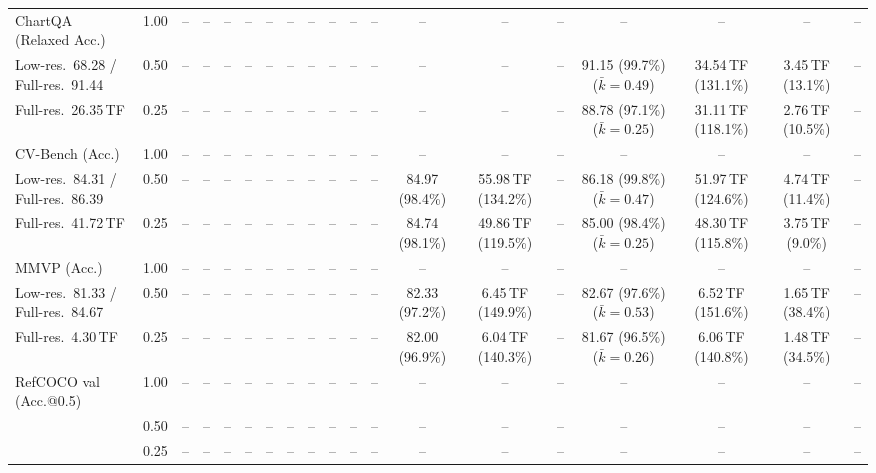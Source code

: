 \begin{table}[t]
{\begin{tabular}{l c | c c c c | c c c c | c c | c c c | c c c c}
\cmidrule(lr){1-19}
ChartQA (Relaxed Acc.) & 1.00 & -- & -- & -- & -- & -- & -- & -- & -- & -- & -- & -- & -- & -- & -- & -- & -- & -- \\
{\footnotesize Low-res.\ 68.28 / Full-res.\ 91.44} & 0.50 & -- & -- & -- & -- & -- & -- & -- & -- & -- & -- & -- & -- & -- & \cellcolor{gray!15}91.15 (99.7\%) {\footnotesize ($\bar k{=}0.49$)} & 34.54\,TF (131.1\%) & 3.45\,TF (13.1\%) & -- \\
{\footnotesize Full-res.\ 26.35\,TF} & 0.25 & -- & -- & -- & -- & -- & -- & -- & -- & -- & -- & -- & -- & -- & 88.78 (97.1\%) {\footnotesize ($\bar k{=}0.25$)} & 31.11\,TF (118.1\%) & 2.76\,TF (10.5\%) & -- \\
\cmidrule(lr){1-19}
CV-Bench (Acc.) & 1.00 & -- & -- & -- & -- & -- & -- & -- & -- & -- & -- & -- & -- & -- & -- & -- & -- & -- \\
{\footnotesize Low-res.\ 84.31 / Full-res.\ 86.39} & 0.50 & -- & -- & -- & -- & -- & -- & -- & -- & -- & -- & \cellcolor{gray!15}84.97 (98.4\%) & 55.98\,TF (134.2\%) & -- & \cellcolor{gray!15}86.18 (99.8\%) {\footnotesize ($\bar k{=}0.47$)} & 51.97\,TF (124.6\%) & 4.74\,TF (11.4\%) & -- \\
{\footnotesize Full-res.\ 41.72\,TF} & 0.25 & -- & -- & -- & -- & -- & -- & -- & -- & -- & -- & \cellcolor{gray!15}84.74 (98.1\%) & 49.86\,TF (119.5\%) & -- & \cellcolor{gray!15}85.00 (98.4\%) {\footnotesize ($\bar k{=}0.25$)} & 48.30\,TF (115.8\%) & 3.75\,TF (9.0\%) & -- \\
\cmidrule(lr){1-19}
MMVP (Acc.) & 1.00 & -- & -- & -- & -- & -- & -- & -- & -- & -- & -- & -- & -- & -- & -- & -- & -- & -- \\
{\footnotesize Low-res.\ 81.33 / Full-res.\ 84.67} & 0.50 & -- & -- & -- & -- & -- & -- & -- & -- & -- & -- & 82.33 (97.2\%) & 6.45\,TF (149.9\%) & -- & 82.67 (97.6\%) {\footnotesize ($\bar k{=}0.53$)} & 6.52\,TF (151.6\%) & 1.65\,TF (38.4\%) & -- \\
{\footnotesize Full-res.\ 4.30\,TF} & 0.25 & -- & -- & -- & -- & -- & -- & -- & -- & -- & -- & 82.00 (96.9\%) & 6.04\,TF (140.3\%) & -- & 81.67 (96.5\%) {\footnotesize ($\bar k{=}0.26$)} & 6.06\,TF (140.8\%) & 1.48\,TF (34.5\%) & -- \\
\cmidrule(lr){1-19}
RefCOCO val (Acc.@0.5) & 1.00 & -- & -- & -- & -- & -- & -- & -- & -- & -- & -- & -- & -- & -- & -- & -- & -- & -- \\
 & 0.50 & -- & -- & -- & -- & -- & -- & -- & -- & -- & -- & -- & -- & -- & -- & -- & -- & -- \\
 & 0.25 & -- & -- & -- & -- & -- & -- & -- & -- & -- & -- & -- & -- & -- & -- & -- & -- & -- \\
\bottomrule
\end{tabular}}
\end{table}
